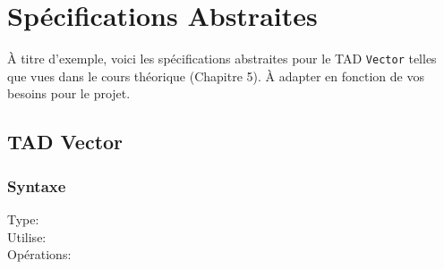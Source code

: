\section{Spécifications Abstraites}\label{tad}
À titre d'exemple, voici les spécifications abstraites pour le TAD \texttt{Vector} telles que vues dans le cours théorique (Chapitre 5).  À adapter en fonction de vos besoins pour le projet.

\subsection{TAD Vector}
\subsubsection{Syntaxe}
\begin{description}
  \item[Type:]
  \item[Utilise:]
  \item[Opérations:]
\end{description}

